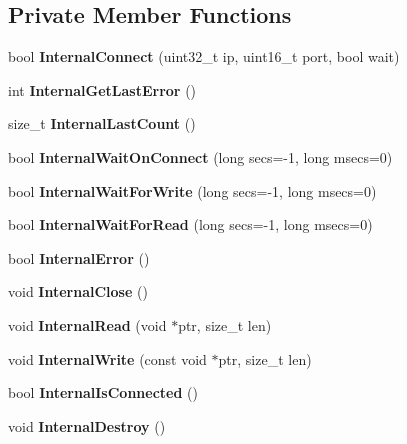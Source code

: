 \subsection*{Private Member Functions}
\begin{DoxyCompactItemize}
\item 
bool {\bfseries InternalConnect} (uint32\_\-t ip, uint16\_\-t port, bool wait)\label{classCECMuleSocket_a713a9f83270ba31a3ea93d24ba5fee88}

\item 
int {\bfseries InternalGetLastError} ()\label{classCECMuleSocket_aff3592b4a82fc4ff8e7eab153134a86f}

\item 
size\_\-t {\bfseries InternalLastCount} ()\label{classCECMuleSocket_a3997763b1a32c982eb6460407644d6dd}

\item 
bool {\bfseries InternalWaitOnConnect} (long secs=-\/1, long msecs=0)\label{classCECMuleSocket_ab3d3ca0005297ead207893d9aa114837}

\item 
bool {\bfseries InternalWaitForWrite} (long secs=-\/1, long msecs=0)\label{classCECMuleSocket_aa9a45ee38cb49871d641adeea3aad118}

\item 
bool {\bfseries InternalWaitForRead} (long secs=-\/1, long msecs=0)\label{classCECMuleSocket_a4ae1388b468eb19d5703171024e5c772}

\item 
bool {\bfseries InternalError} ()\label{classCECMuleSocket_a9ae3511632be6b9dd7fba4ea0eea1253}

\item 
void {\bfseries InternalClose} ()\label{classCECMuleSocket_a0d2d47fc5b8a4ae23080a7c4d0e80172}

\item 
void {\bfseries InternalRead} (void $\ast$ptr, size\_\-t len)\label{classCECMuleSocket_a7a7bab4e9c412528d736e153a23ddb2b}

\item 
void {\bfseries InternalWrite} (const void $\ast$ptr, size\_\-t len)\label{classCECMuleSocket_a56ab9b9eade83e661bb3603f2f27b93b}

\item 
bool {\bfseries InternalIsConnected} ()\label{classCECMuleSocket_aba7c02f6846661bd66b2162419dc4168}

\item 
void {\bfseries InternalDestroy} ()\label{classCECMuleSocket_a93a460185fcb5d0ece80f0fd4911b152}

\end{DoxyCompactItemize}


